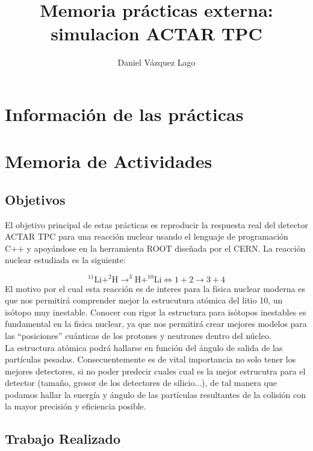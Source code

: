 \documentclass[12pt,a4paper]{article}
\title{Memoria prácticas externa: simulacion ACTAR TPC}
\author{Daniel Vázquez Lago}
\numberwithin{equation}{section}
\numberwithin{figure}{section}
\begin{document}
\maketitle

\newpage

\tableofcontents

\newpage

\section{Información de las prácticas}

\section{Memoria de Actividades}

\subsection{Objetivos}

El objetivo principal de estas prácticas es reproducir la respuesta real del detector ACTAR TPC para una reacción nuclear usando el lenguaje de programación C++ y apoyándose en la herramienta ROOT diseñada por el CERN. La reacción nuclear estudiada es la siguiente:

\begin{equation}
    ^{11}\mathrm{Li}+^2\mathrm{H} \rightarrow ^3\mathrm{H}+^{10}\mathrm{Li} \Longleftrightarrow 1 + 2 \rightarrow 3 + 4
\end{equation}
El motivo por el cual esta reacción es de interes para la física nuclear moderna es que nos permitirá comprender mejor la estrucutura atómica del litio 10, un isótopo muy inestable. Conocer con rigor la estructura para isótopos inestables es fundamental en la fisica nuclear, ya que nos permitirá crear mejores modelos para las ``posiciones'' cuánticas de los protones y neutrones dentro del núcleo. \\ 

La estructura atómica podrá hallarse en función del ángulo de salida de las partículas pesadas. Consecuentemente es de vital importancia no solo tener los mejores detectores, si no poder predecir cuales cual es la mejor estrucutra para el detector (tamaño, grosor de los detectores de silicio...), de tal manera que podamos hallar la energía y ángulo de las partículas resultantes de la colisión con la mayor precisión y eficiencia posible.


\subsection{Trabajo Realizado}
\end{document}

